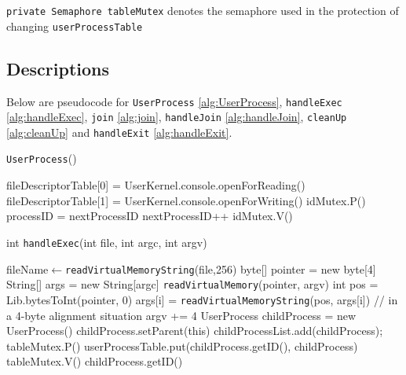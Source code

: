 \documentclass{article}
\newcommand{\eq}{$\leftarrow$}
\begin{document}
\begin{spacing}{1.1}
\texttt{private Semaphore tableMutex} denotes the semaphore used in the protection of changing \linebreak \texttt{userProcessTable}
\subsection{Descriptions}
Below are pseudocode for \texttt{UserProcess} \ref{alg:UserProcess}, \texttt{handleExec} \ref{alg:handleExec}, \texttt{join} \ref{alg:join}, \texttt{handleJoin} \ref{alg:handleJoin}, \texttt{cleanUp} \ref{alg:cleanUp} and \texttt{handleExit} \ref{alg:handleExit}.
\begin{algorithm}[htbp]
  \label{alg:UserProcess}
\caption{\texttt{UserProcess}()}
  \begin{algorithmic}[1]
    \STATE fileDescriptorTable[0] = UserKernel.console.openForReading()
    \STATE fileDescriptorTable[1] = UserKernel.console.openForWriting()
    \STATE \colorbox{myyellow}{idMutex.P()}
	\STATE processID = nextProcessID
	\STATE nextProcessID++
	\STATE \colorbox{myyellow}{idMutex.V()}
  \end{algorithmic}
\end{algorithm}

\begin{algorithm}[htbp]
\label{alg:handleExec}
\caption{int \texttt{handleExec}(int file, int argc, int argv)}
  \begin{algorithmic}[1]
    \STATE fileName\eq\texttt{readVirtualMemoryString}(file,256)
    \ENDIF
    \ENDIF
      \STATE byte[] pointer = new byte[4]
      \STATE String[] args = new String[argc]
        \STATE \texttt{readVirtualMemory}(pointer, argv)
        \STATE int pos = Lib.bytesToInt(pointer, 0)
        \STATE args[i] = \texttt{readVirtualMemoryString}(pos, args[i])
        \STATE \colorbox{myyellow}{// in a 4-byte alignment situation}
        \STATE argv += 4
        \ENDFOR
    \STATE UserProcess childProcess = new UserProcess()
    \ENDIF
    \STATE childProcess.setParent(this)
    \STATE childProcessList.add(childProcess);
    \STATE \colorbox{myyellow}{tableMutex.P()}
    \STATE userProcessTable.put(childProcess.getID(), childProcess)
    \STATE \colorbox{myyellow}{tableMutex.V()}
    \ENDIF
    \RETURN childProcess.getID()
  \end{algorithmic}
\end{algorithm}


\end{spacing}
\end{document}
